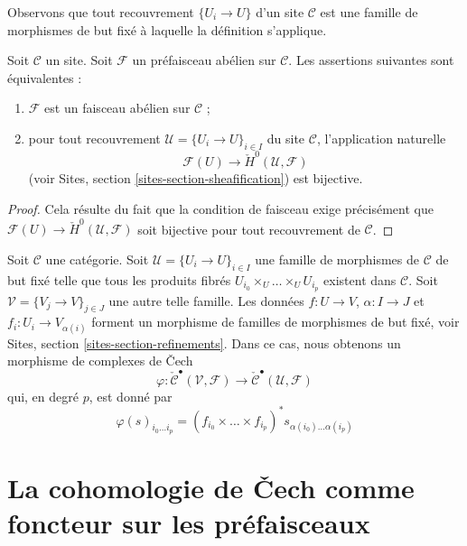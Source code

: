 \noindent
Observons que tout recouvrement $\{U_i \to U\}$ d'un site $\mathcal{C}$
est une famille de morphismes de but fixé à laquelle la définition s'applique.

\begin{lemma}
\label{lemma-cech-h0}
Soit $\mathcal{C}$ un site.
Soit $\mathcal{F}$ un préfaisceau abélien sur $\mathcal{C}$.
Les assertions suivantes sont équivalentes :
\begin{enumerate}
\item $\mathcal{F}$ est un faisceau abélien sur $\mathcal{C}$ ;
\item pour tout recouvrement $\mathcal{U} = \{U_i \to U\}_{i \in I}$
du site $\mathcal{C}$, l'application naturelle
$$
\mathcal{F}(U) \to \check{H}^0(\mathcal{U}, \mathcal{F})
$$
(voir Sites, section \ref{sites-section-sheafification}) est bijective.
\end{enumerate}
\end{lemma}

\begin{proof}
Cela résulte du fait que la condition de faisceau exige précisément que
$\mathcal{F}(U) \to \check{H}^0(\mathcal{U}, \mathcal{F})$
soit bijective pour tout recouvrement de $\mathcal{C}$.
\end{proof}

\noindent
Soit $\mathcal{C}$ une catégorie. Soit $\mathcal{U} = \{U_i \to U\}_{i\in I}$
une famille de morphismes de $\mathcal{C}$ de but fixé telle que
tous les produits fibrés $U_{i_0} \times_U \ldots \times_U U_{i_p}$ existent dans
$\mathcal{C}$. Soit $\mathcal{V} = \{V_j \to V\}_{j\in J}$ une autre telle famille.
Les données $f : U \to V$, $\alpha : I \to J$ et $f_i : U_i \to V_{\alpha(i)}$
forment un morphisme de familles de morphismes de but fixé, voir
Sites, section \ref{sites-section-refinements}.
Dans ce cas, nous obtenons un morphisme de complexes de {\v C}ech
\begin{equation}
\label{equation-map-cech-complexes}
\varphi : \check{\mathcal{C}}^\bullet(\mathcal{V}, \mathcal{F})
\longrightarrow
\check{\mathcal{C}}^\bullet(\mathcal{U}, \mathcal{F})
\end{equation}
qui, en degré $p$, est donné par
$$
\varphi(s)_{i_0 \ldots i_p} =
(f_{i_0} \times \ldots \times f_{i_p})^*s_{\alpha(i_0) \ldots \alpha(i_p)}
$$


\section{La cohomologie de {\v C}ech comme foncteur sur les préfaisceaux}
\label{section-cech-functor}

